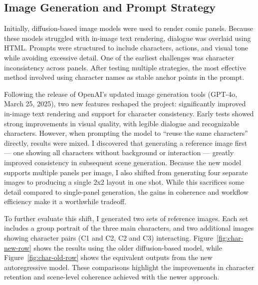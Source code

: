 \subsection{Image Generation and Prompt Strategy}\label{subsec:image-generation-and-prompt-strategy}

Initially, diffusion-based image models were used to render comic panels.
Because these models struggled with in-image text rendering, dialogue was overlaid using HTML\@.
Prompts were structured to include characters, actions, and visual tone while avoiding excessive detail.
One of the earliest challenges was character inconsistency across panels.
After testing multiple strategies, the most effective method involved using character names as stable anchor points in the prompt.

Following the release of OpenAI's updated image generation tools (GPT-4o, March 25, 2025),
two new features reshaped the project: significantly improved in-image text rendering and support for character consistency.
Early tests showed strong improvements in visual quality, with legible dialogue and recognizable characters.
However, when prompting the model to ``reuse the same characters'' directly, results were mixed.
I discovered that generating a reference image first --- one showing all characters without background
or interaction --- greatly improved consistency in subsequent scene generation.
Because the new model supports multiple panels per image,
I also shifted from generating four separate images to producing a single 2x2 layout in one shot.
While this sacrifices some detail compared to single-panel generation,
the gains in coherence and workflow efficiency make it a worthwhile tradeoff.


To further evaluate this shift, I generated two sets of reference images.
Each set includes a group portrait of the three main characters,
and two additional images showing character pairs (C1 and C2, C2 and C3) interacting.
Figure~\ref{fig:char-new-row} shows the results using the older diffusion-based model,
while Figure~\ref{fig:char-old-row} shows  the equivalent outputs from the new autoregressive model.
These comparisons highlight the improvements in character retention and scene-level coherence achieved with the newer approach.

